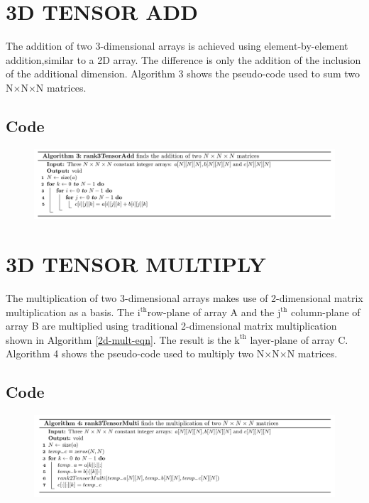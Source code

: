 \section{3D TENSOR ADD}
The addition of two 3-dimensional arrays is achieved using element-by-element addition,similar to a 2D array. The difference is only the addition of the inclusion of the additional dimension. Algorithm 3 shows
the pseudo-code used to sum two N$\times$N$\times$N matrices.
\subsection{Code}
\begin{figure}[h!]
\includegraphics[width=\textwidth]{build/Algo3.png}
\end{figure}
\section{3D TENSOR MULTIPLY}
The multiplication of two 3-dimensional arrays makes use of 2-dimensional matrix multiplication as a basis. The $\text{i}^\text{th}$row-plane of array A and the $\text{j}^\text{th}$ column-plane of array B are multiplied using traditional 2-dimensional matrix multiplication shown in Algorithm \ref{2d-mult-eqn}. The result is the $\text{k}^\text{th}$ layer-plane of array C. Algorithm 4 shows the
pseudo-code used to multiply two N$\times$N$\times$N matrices.
\subsection{Code}
\begin{figure}[h!]
\includegraphics[width=\textwidth]{build/Algo4.png}
\end{figure}
